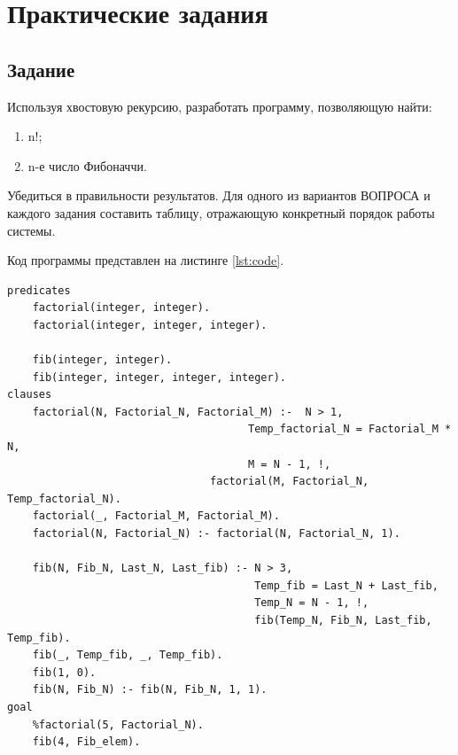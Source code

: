 \chapter{Практические задания}
\section{Задание}
\vspace{-0.7cm}
Используя хвостовую рекурсию, разработать программу, позволяющую найти:
\vspace{-0.5cm}
\begin{enumerate}
	\item n!;
	\item n-е число Фибоначчи.
\end{enumerate}
\vspace{-0.5cm}
Убедиться в правильности результатов.
Для одного из вариантов ВОПРОСА и каждого задания составить таблицу,
отражающую конкретный порядок работы системы.

Код программы представлен на листинге \ref{lst:code}.
\begin{lstlisting}[label=lst:code, basicstyle=\footnotesize, caption=Код программы]
predicates
	factorial(integer, integer).
	factorial(integer, integer, integer).
	
	fib(integer, integer).
	fib(integer, integer, integer, integer).
clauses
	factorial(N, Factorial_N, Factorial_M) :-  N > 1,
									  Temp_factorial_N = Factorial_M * N,
									  M = N - 1, !,
								factorial(M, Factorial_N, Temp_factorial_N).
	factorial(_, Factorial_M, Factorial_M).
	factorial(N, Factorial_N) :- factorial(N, Factorial_N, 1).
	
	fib(N, Fib_N, Last_N, Last_fib) :- N > 3, 
									   Temp_fib = Last_N + Last_fib, 
									   Temp_N = N - 1, !,
									   fib(Temp_N, Fib_N, Last_fib, Temp_fib).
	fib(_, Temp_fib, _, Temp_fib).
	fib(1, 0).
	fib(N, Fib_N) :- fib(N, Fib_N, 1, 1).
goal
	%factorial(5, Factorial_N).
	fib(4, Fib_elem).
\end{lstlisting}

